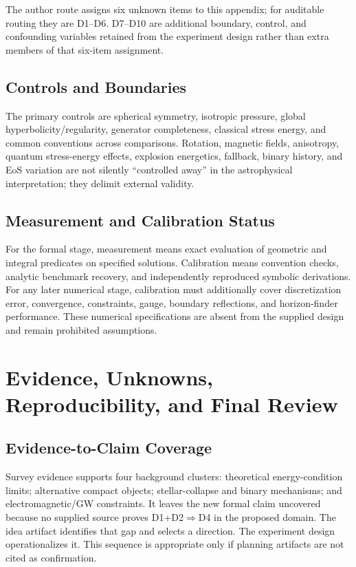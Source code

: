 \documentclass[conference]{IEEEtran}
\begin{document}
The author route assigns six unknown items to this appendix; for auditable routing they are D1--D6. D7--D10 are additional boundary, control, and confounding variables retained from the experiment design rather than extra members of that six-item assignment.

\subsection{Controls and Boundaries}
The primary controls are spherical symmetry, isotropic pressure, global hyperbolicity/regularity, generator completeness, classical stress energy, and common conventions across comparisons. Rotation, magnetic fields, anisotropy, quantum stress-energy effects, explosion energetics, fallback, binary history, and EoS variation are not silently ``controlled away'' in the astrophysical interpretation; they delimit external validity.

\subsection{Measurement and Calibration Status}
For the formal stage, measurement means exact evaluation of geometric and integral predicates on specified solutions. Calibration means convention checks, analytic benchmark recovery, and independently reproduced symbolic derivations. For any later numerical stage, calibration must additionally cover discretization error, convergence, constraints, gauge, boundary reflections, and horizon-finder performance. These numerical specifications are absent from the supplied design and remain prohibited assumptions.

\section{Evidence, Unknowns, Reproducibility, and Final Review}
\label{app:evidence}

\subsection{Evidence-to-Claim Coverage}
Survey evidence supports four background clusters: theoretical energy-condition limits; alternative compact objects; stellar-collapse and binary mechanisms; and electromagnetic/GW constraints. It leaves the new formal claim uncovered because no supplied source proves D1+D2$\Rightarrow$D4 in the proposed domain. The idea artifact identifies that gap and selects a direction. The experiment design operationalizes it. This sequence is appropriate only if planning artifacts are not cited as confirmation.
\end{document}
